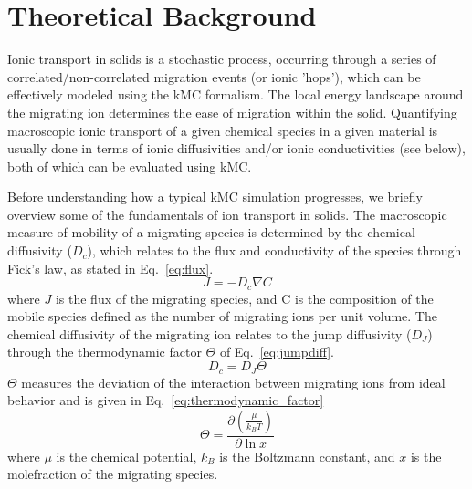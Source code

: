 \documentclass[a4paper,fleqn]{cas-dc}
\begin{document}
\section{Theoretical Background}\label{sec:theory}

\noindent Ionic transport in solids is a stochastic process, occurring through a series of correlated/non-correlated migration events (or ionic 'hops'), which can be effectively modeled using the kMC formalism. The local energy landscape around the migrating ion determines the ease of migration within the solid. Quantifying macroscopic ionic transport of a given chemical species in a given material is usually done in terms of ionic diffusivities and/or ionic conductivities (see below), both of which can be evaluated using kMC.\cite{van_der_ven_first-principles_2001}  

Before understanding how a typical kMC simulation progresses, we briefly overview some of the fundamentals of ion transport in solids. The macroscopic measure of  mobility of a migrating species is determined by the chemical diffusivity ($D_{c}$), which relates to the flux and conductivity of the species through Fick's law\cite{fick_v_1855,fick_ueber_1855}, as stated in Eq.~{\ref{eq:flux}.} 
%
\begin{equation}
    \label{eq:flux}
    J= -D_{c} \nabla C
\end{equation}
%
where $J$ is the flux of the migrating species, and C is the composition of the mobile species defined as the number of migrating ions per unit volume. The chemical diffusivity of the migrating ion relates to the jump diffusivity ($D_J$) through the thermodynamic factor $\Theta$ of  Eq.~{\ref{eq:jumpdiff}}.
%
\begin{equation}
\label{eq:jumpdiff}
D_{c} = D_{J} \Theta
\end{equation}
%
$\Theta$ measures the deviation of the interaction between migrating ions from ideal behavior and is given in Eq.~\ref{eq:thermodynamic_factor}
%
\begin{equation}
\label{eq:thermodynamic_factor}
\Theta = \frac{\partial \left(\frac{\mu}{k_B T}\right)}{\partial \ln{x}}
\end{equation}
%
where $\mu$ is the chemical potential, $k_B$ is the Boltzmann constant, and $x$ is the molefraction of the migrating species. 
\end{document}
